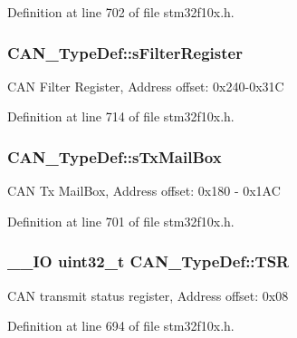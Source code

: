 Definition at line 702 of file stm32f10x.\-h.

\hypertarget{struct_c_a_n___type_def_aaf5116cf475c48e9f4db550100faa2d9}{
\subsubsection[{s\-Filter\-Register}]{ C\-A\-N\-\_\-\-Type\-Def\-::s\-Filter\-Register}}\label{struct_c_a_n___type_def_aaf5116cf475c48e9f4db550100faa2d9}
C\-A\-N Filter Register, Address offset\-: 0x240-\/0x31\-C 

Definition at line 714 of file stm32f10x.\-h.

\hypertarget{struct_c_a_n___type_def_ab78f764584ec276cd36960d4f4fcdc1a}{
\subsubsection[{s\-Tx\-Mail\-Box}]{ C\-A\-N\-\_\-\-Type\-Def\-::s\-Tx\-Mail\-Box}}\label{struct_c_a_n___type_def_ab78f764584ec276cd36960d4f4fcdc1a}
C\-A\-N Tx Mail\-Box, Address offset\-: 0x180 -\/ 0x1\-A\-C 

Definition at line 701 of file stm32f10x.\-h.

\hypertarget{struct_c_a_n___type_def_acbc82ac4e87e75350fc586be5e56d95b}{
\subsubsection[{T\-S\-R}]{\setlength{\rightskip}{0pt plus 5cm}\-\_\-\-\_\-\-I\-O {\bf uint32\-\_\-t} C\-A\-N\-\_\-\-Type\-Def\-::\-T\-S\-R}}\label{struct_c_a_n___type_def_acbc82ac4e87e75350fc586be5e56d95b}
C\-A\-N transmit status register, Address offset\-: 0x08 

Definition at line 694 of file stm32f10x.\-h.



